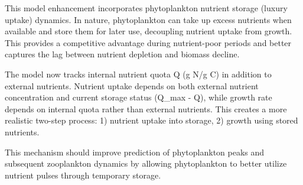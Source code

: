 This model enhancement incorporates phytoplankton nutrient storage (luxury uptake) dynamics. 
In nature, phytoplankton can take up excess nutrients when available and store them for later use, 
decoupling nutrient uptake from growth. This provides a competitive advantage during nutrient-poor periods 
and better captures the lag between nutrient depletion and biomass decline.

The model now tracks internal nutrient quota Q (g N/g C) in addition to external nutrients. 
Nutrient uptake depends on both external nutrient concentration and current storage status (Q_max - Q), 
while growth rate depends on internal quota rather than external nutrients. This creates a more realistic 
two-step process: 1) nutrient uptake into storage, 2) growth using stored nutrients.

This mechanism should improve prediction of phytoplankton peaks and subsequent zooplankton dynamics by 
allowing phytoplankton to better utilize nutrient pulses through temporary storage.
